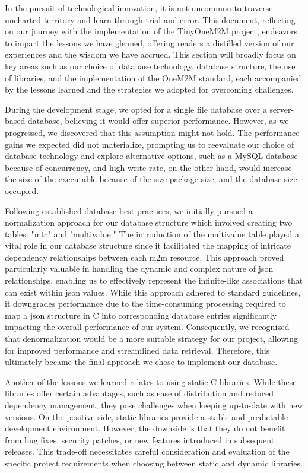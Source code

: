 \documentclass[a4paper,fleqn]{cas-dc}
\begin{document}
In the pursuit of technological innovation, it is not uncommon to traverse uncharted territory and learn through trial and error. This document, reflecting on our journey with the implementation of the TinyOneM2M project, endeavors to impart the lessons we have gleaned, offering readers a distilled version of our experiences and the wisdom we have accrued. This section will broadly focus on key areas such as our choice of database technology, database structure, the use of libraries, and the implementation of the OneM2M standard, each accompanied by the lessons learned and the strategies we adopted for overcoming challenges.

During the development stage, we opted for a single file database over a server-based database, believing it would offer superior performance. However, as we progressed, we discovered that this assumption might not hold. The performance gains we expected did not materialize, prompting us to reevaluate our choice of database technology and explore alternative options, such as a MySQL database because of concurrency, and high write rate, on the other hand, would increase the size of the executable because of the size package size, and the database size occupied.

Following established database best practices, we initially pursued a normalization approach for our database structure which involved creating two tables: "mtc" and "multivalue." The introduction of the multivalue table played a vital role in our database structure since it facilitated the mapping of intricate dependency relationships between each \gls{m2m} resource. This approach proved particularly valuable in handling the dynamic and complex nature of \gls{json} relationships, enabling us to effectively represent the infinite-like associations that can exist within \gls{json} values. While this approach adhered to standard guidelines, it downgrades performance due to the time-consuming processing required to map a \gls{json} structure in C into corresponding database entries significantly impacting the overall performance of our system. Consequently, we recognized that denormalization would be a more suitable strategy for our project, allowing for improved performance and streamlined data retrieval. Therefore, this ultimately became the final approach we chose to implement our database.

Another of the lessons we learned relates to using static C libraries. While these libraries offer certain advantages, such as ease of distribution and reduced dependency management, they pose challenges when keeping up-to-date with new versions. On the positive side, static libraries provide a stable and predictable development environment. However, the downside is that they do not benefit from bug fixes, security patches, or new features introduced in subsequent releases. This trade-off necessitates careful consideration and evaluation of the specific project requirements when choosing between static and dynamic libraries.
\end{document}
